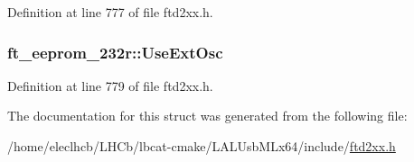 Definition at line 777 of file ftd2xx.h.\hypertarget{structft__eeprom__232r_af430c36e3ca675a6860463b70b963369}{
\subsubsection[{UseExtOsc}]{ {\bf ft\_\-eeprom\_\-232r::UseExtOsc}}}
\label{structft__eeprom__232r_af430c36e3ca675a6860463b70b963369}


Definition at line 779 of file ftd2xx.h.

The documentation for this struct was generated from the following file:\begin{DoxyCompactItemize}
\item 
/home/eleclhcb/LHCb/lbcat-\/cmake/LALUsbMLx64/include/\hyperlink{LALUsbMLx64_2include_2ftd2xx_8h}{ftd2xx.h}\end{DoxyCompactItemize}
